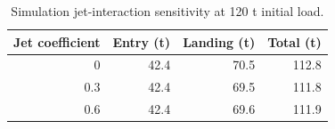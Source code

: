 \begin{table}[htbp]
\caption{Simulation jet-interaction sensitivity at 120 t initial load.}
\label{tab:src12}
\small
\setlength{\tabcolsep}{3.5pt}
\begin{tabularx}{\linewidth}{@{}rrrr@{}}
\toprule
Jet coefficient & Entry (t) & Landing (t) & Total (t) \\
\midrule
0 & 42.4 & 70.5 & 112.8 \\
0.3 & 42.4 & 69.5 & 111.8 \\
0.6 & 42.4 & 69.6 & 111.9 \\
\bottomrule
\end{tabularx}
\par{}
\end{table}
